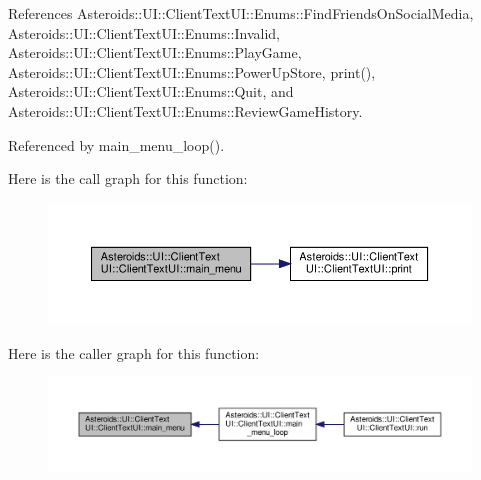 References Asteroids\+::\+U\+I\+::\+Client\+Text\+U\+I\+::\+Enums\+::\+Find\+Friends\+On\+Social\+Media, Asteroids\+::\+U\+I\+::\+Client\+Text\+U\+I\+::\+Enums\+::\+Invalid, Asteroids\+::\+U\+I\+::\+Client\+Text\+U\+I\+::\+Enums\+::\+Play\+Game, Asteroids\+::\+U\+I\+::\+Client\+Text\+U\+I\+::\+Enums\+::\+Power\+Up\+Store, print(), Asteroids\+::\+U\+I\+::\+Client\+Text\+U\+I\+::\+Enums\+::\+Quit, and Asteroids\+::\+U\+I\+::\+Client\+Text\+U\+I\+::\+Enums\+::\+Review\+Game\+History.



Referenced by main\+\_\+menu\+\_\+loop().

Here is the call graph for this function\+:
\nopagebreak
\begin{figure}[H]
\begin{center}
\leavevmode
\includegraphics[width=350pt]{classAsteroids_1_1UI_1_1ClientTextUI_1_1ClientTextUI_a9d9c6942f7cf39ddb177df02fbe3e742_cgraph}
\end{center}
\end{figure}
Here is the caller graph for this function\+:
\nopagebreak
\begin{figure}[H]
\begin{center}
\leavevmode
\includegraphics[width=350pt]{classAsteroids_1_1UI_1_1ClientTextUI_1_1ClientTextUI_a9d9c6942f7cf39ddb177df02fbe3e742_icgraph}
\end{center}
\end{figure}
\mbox{\label{classAsteroids_1_1UI_1_1ClientTextUI_1_1ClientTextUI_a67521714973f97f76618f9598d34d3b8}} 
